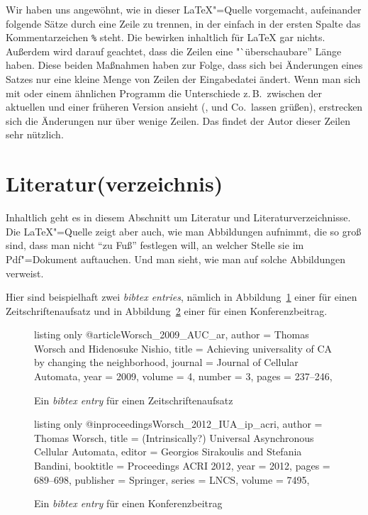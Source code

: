 Wir haben uns angewöhnt, wie in dieser \LaTeX"=Quelle vorgemacht, aufeinander
folgende Sätze durch eine Zeile zu trennen, in der einfach in der ersten
Spalte das Kommentarzeichen \verb|%| steht.
%
Die bewirken inhaltlich für \LaTeX{} gar nichts.
%
Außerdem wird darauf geachtet, dass die Zeilen eine "`überschaubare'' Länge
haben.
%
Diese beiden Maßnahmen haben zur Folge, dass sich bei Änderungen eines Satzes
nur eine kleine Menge von Zeilen der Eingabedatei ändert.
%
Wenn man sich mit  oder einem ähnlichen Programm die
Unterschiede z.\,B.~zwischen der aktuellen und einer früheren Version ansieht
(,  und Co.~lassen grüßen), erstrecken sich
die Änderungen nur über wenige Zeilen.
%
Das findet der Autor dieser Zeilen sehr nützlich.

\section{Literatur(verzeichnis)}
\label{sec:literatur}

Inhaltlich geht es in diesem Abschnitt um Literatur und
Literaturverzeichnisse.
%
Die \LaTeX"=Quelle zeigt aber auch, wie man Abbildungen aufnimmt, die so groß
sind, dass man nicht "`zu Fuß"' festlegen will, an welcher Stelle sie im
Pdf"=Dokument auftauchen.
%
Und man sieht, wie man auf solche Abbildungen verweist.

Hier sind beispielhaft zwei \emph{bibtex entries}, nämlich in
Abbildung~\ref{bibtex:article} einer für einen Zeitschriftenaufsatz und in
Abbildung~\ref{bibtex:inproceedings} einer für einen Konferenzbeitrag.

\begin{figure}[htb]
\begin{tcblisting}{listing only}
@article{Worsch_2009_AUC_ar,
  author  = {Thomas Worsch and Hidenosuke Nishio},
  title   = {Achieving universality of {CA} by changing the neighborhood},
  journal = {Journal of Cellular Automata},
  year    = {2009},
  volume  = {4},
  number  = {3},
  pages   = {237--246},
}
\end{tcblisting}
\caption{Ein \emph{bibtex entry} für einen Zeitschriftenaufsatz}
\label{bibtex:article}
\end{figure}

\begin{figure}[htb]
\begin{tcblisting}{listing only}
@inproceedings{Worsch_2012_IUA_ip_acri,
  author    = {Thomas Worsch},
  title     = {({I}ntrinsically?) Universal Asynchronous Cellular Automata},
  editor    = {Georgios Sirakoulis and Stefania Bandini},
  booktitle = {Proceedings ACRI 2012},
  year      = {2012},
  pages     = {689--698},
  publisher = {Springer},
  series    = {LNCS},
  volume    = {7495},
}
\end{tcblisting}
\caption{Ein \emph{bibtex entry} für einen Konferenzbeitrag}
\label{bibtex:inproceedings}
\end{figure}


